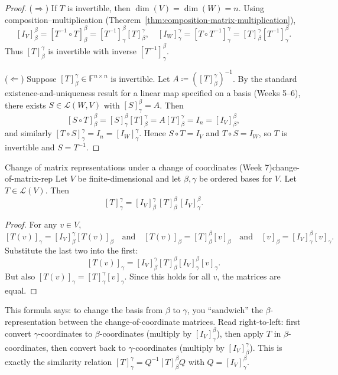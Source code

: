\begin{proof}
($\Rightarrow$) If $T$ is invertible, then $\dim(V)=\dim(W)=n$.
Using composition--multiplication (Theorem~\ref{thm:composition-matrix-multiplication}),
\[
[I_V]^{\beta}_{\beta}=[T^{-1}\circ T]^{\beta}_{\beta}=[T^{-1}]^{\beta}_{\gamma}[T]^{\gamma}_{\beta},
\quad
[I_W]^{\gamma}_{\gamma}=[T\circ T^{-1}]^{\gamma}_{\gamma}=[T]^{\gamma}_{\beta}[T^{-1}]^{\beta}_{\gamma}.
\]
Thus $[T]^{\gamma}_{\beta}$ is invertible with inverse $[T^{-1}]^{\beta}_{\gamma}$.

($\Leftarrow$) Suppose $[T]^{\gamma}_{\beta}\in\mathbb{F}^{n\times n}$ is invertible.
Let $A\coloneqq([T]^{\gamma}_{\beta})^{-1}$.
By the standard existence-and-uniqueness result for a linear map specified on a basis (Weeks 5--6),
there exists $S\in\mathcal{L}(W,V)$ with $[S]^{\beta}_{\gamma}=A$.
Then
\[
[S\circ T]^{\beta}_{\beta}=[S]^{\beta}_{\gamma}[T]^{\gamma}_{\beta}=A[T]^{\gamma}_{\beta}=I_n=[I_V]^{\beta}_{\beta},
\]
and similarly $[T\circ S]^{\gamma}_{\gamma}=I_n=[I_W]^{\gamma}_{\gamma}$.
Hence $S\circ T=I_V$ and $T\circ S=I_W$, so $T$ is invertible and $S=T^{-1}$.
\end{proof}

\begin{theorem}{Change of matrix representations under a change of coordinates (Week 7)}{change-of-matrix-rep}
Let $V$ be finite-dimensional and let $\beta,\gamma$ be ordered bases for $V$.
Let $T\in\mathcal{L}(V)$. Then
\[
[T]^{\gamma}_{\gamma} = [I_V]^{\gamma}_{\beta}\,[T]^{\beta}_{\beta}\,[I_V]^{\beta}_{\gamma}.
\]
\end{theorem}

\begin{proof}
For any $v\in V$,
\[
[T(v)]_\gamma = [I_V]^{\gamma}_{\beta}[T(v)]_\beta
\quad\text{and}\quad
[T(v)]_\beta = [T]^{\beta}_{\beta}[v]_\beta
\quad\text{and}\quad
[v]_\beta = [I_V]^{\beta}_{\gamma}[v]_\gamma.
\]
Substitute the last two into the first:
\[
[T(v)]_\gamma
=[I_V]^{\gamma}_{\beta}[T]^{\beta}_{\beta}[I_V]^{\beta}_{\gamma}[v]_\gamma.
\]
But also $[T(v)]_\gamma=[T]^{\gamma}_{\gamma}[v]_\gamma$.
Since this holds for all $v$, the matrices are equal.

\end{proof}

This formula says: to change the basis from $\beta$ to $\gamma$, you ``sandwich'' the $\beta$-representation between the change-of-coordinate matrices.
Read right-to-left: first convert $\gamma$-coordinates to $\beta$-coordinates (multiply by $[I_V]^{\beta}_{\gamma}$), then apply $T$ in $\beta$-coordinates, then convert back to $\gamma$-coordinates (multiply by $[I_V]^{\gamma}_{\beta}$).
This is exactly the similarity relation $[T]^{\gamma}_{\gamma}=Q^{-1}[T]^{\beta}_{\beta}Q$ with $Q=[I_V]^{\beta}_{\gamma}$.

